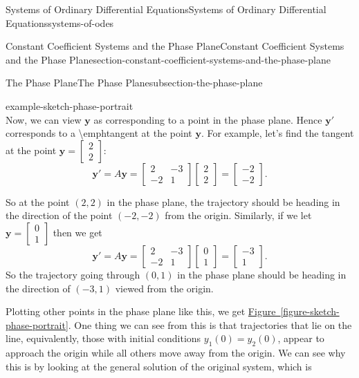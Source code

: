 \documentclass[oneside,10pt,]{book}
\numberwithin{equation}{section}
\renewcommand{\vec}[1]{\mathbf{#1}}
\newcommand{\amp}{&}
\begin{document}
\begin{chapterptx}{Systems of Ordinary Differential Equations}{}{Systems of Ordinary Differential Equations}{}{}{systems-of-odes}
\begin{sectionptx}{Constant Coefficient Systems and the Phase Plane}{}{Constant Coefficient Systems and the Phase Plane}{}{}{section-constant-coefficient-systems-and-the-phase-plane}
\begin{subsectionptx}{The Phase Plane}{}{The Phase Plane}{}{}{subsection-the-phase-plane}
\begin{example}{}{example-sketch-phase-portrait}
\begin{equation*}
\end{equation*}
Now, we can view \(\vec{y}\) as corresponding to a point in the phase plane. Hence \(\vec{y}'\) corresponds to a \textbackslash{}emph\textbraceleft{}tangent\textbraceright{} at the point \(\vec{y}\). For example, let's find the tangent at the point \(\vec{y} = \begin{bmatrix}2\\2\end{bmatrix}\):%
\begin{equation*}
\vec{y}' = A\vec{y} = \begin{bmatrix}2 \amp  -3 \\ -2 \amp  1\end{bmatrix}\begin{bmatrix}2\\2\end{bmatrix} = \begin{bmatrix}-2 \\ -2\end{bmatrix}.
\end{equation*}
%
\par
\hypertarget{p-371}{}%
So at the point \((2,2)\) in the phase plane, the trajectory should be heading in the direction of the point \((-2,-2)\) from the origin. Similarly, if we let \(\vec{y} = \begin{bmatrix}0\\1\end{bmatrix}\) then we get%
\begin{equation*}
\vec{y}' = A\vec{y} = \begin{bmatrix}2 \amp  -3 \\ -2 \amp  1\end{bmatrix}\begin{bmatrix}0\\1\end{bmatrix} = \begin{bmatrix}-3 \\ 1\end{bmatrix}.
\end{equation*}
So the trajectory going through \((0,1)\) in the phase plane should be heading in the direction of \((-3,1)\) viewed from the origin.%
\par
\hypertarget{p-372}{}%
Plotting other points in the phase plane like this, we get \hyperref[figure-sketch-phase-portrait]{Figure~\ref{figure-sketch-phase-portrait}}. One thing we can see from this is that trajectories that lie on the line, equivalently, those with initial conditions \(y_{1}(0) = y_{2}(0)\), appear to approach the origin while all others move away from the origin. We can see why this is by looking at the general solution of the original system, which is%

\end{example}
\end{subsectionptx}
\end{sectionptx}
\end{chapterptx}
\end{document}
